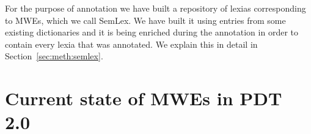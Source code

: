 \documentclass[11pt]{article}
\begin{document}

For the purpose of annotation we have built a repository of lexias corresponding to MWEs, which we call SemLex. We have built it using entries from some existing dictionaries and it is being enriched during the annotation in order to contain every lexia that was annotated. We explain this in detail in Section~\ref{sec:meth:semlex}. 




\section{Current state of MWEs in PDT 2.0}
\label{sec:pdt}
%
\end{document}
